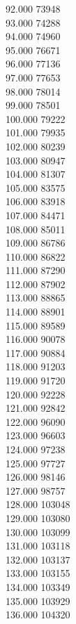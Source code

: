 { 92.000	73948 \\
 93.000	74288 \\
 94.000	74960 \\
 95.000	76671 \\
 96.000	77136 \\
 97.000	77653 \\
 98.000	78014 \\
 99.000	78501 \\
 100.000	79222 \\
 101.000	79935 \\
 102.000	80239 \\
 103.000	80947 \\
 104.000	81307 \\
 105.000	83575 \\
 106.000	83918 \\
 107.000	84471 \\
 108.000	85011 \\
 109.000	86786 \\
 110.000	86822 \\
 111.000	87290 \\
 112.000	87902 \\
 113.000	88865 \\
 114.000	88901 \\
 115.000	89589 \\
 116.000	90078 \\
 117.000	90884 \\
 118.000	91203 \\
 119.000	91720 \\
 120.000	92228 \\
 121.000	92842 \\
 122.000	96090 \\
 123.000	96603 \\
 124.000	97238 \\
 125.000	97727 \\
 126.000	98146 \\
 127.000	98757 \\
 128.000	103048 \\
 129.000	103080 \\
 130.000	103099 \\
 131.000	103118 \\
 132.000	103137 \\
 133.000	103155 \\
 134.000	103349 \\
 135.000	103929 \\
 136.000	104320 \\
}
